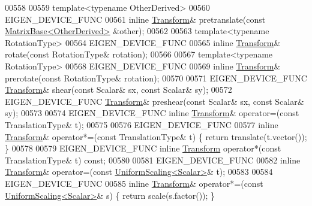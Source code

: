 \begin{DoxyCode}
00558 
00559   \textcolor{keyword}{template}<\textcolor{keyword}{typename} OtherDerived>
00560   EIGEN\_DEVICE\_FUNC
00561   \textcolor{keyword}{inline} \hyperlink{group___geometry___module_class_eigen_1_1_transform}{Transform}& pretranslate(\textcolor{keyword}{const} \hyperlink{group___core___module_class_eigen_1_1_matrix_base}{MatrixBase<OtherDerived>} &other);
00562 
00563   \textcolor{keyword}{template}<\textcolor{keyword}{typename} RotationType>
00564   EIGEN\_DEVICE\_FUNC
00565   \textcolor{keyword}{inline} \hyperlink{group___geometry___module_class_eigen_1_1_transform}{Transform}& rotate(\textcolor{keyword}{const} RotationType& rotation);
00566 
00567   \textcolor{keyword}{template}<\textcolor{keyword}{typename} RotationType>
00568   EIGEN\_DEVICE\_FUNC
00569   \textcolor{keyword}{inline} \hyperlink{group___geometry___module_class_eigen_1_1_transform}{Transform}& prerotate(\textcolor{keyword}{const} RotationType& rotation);
00570 
00571   EIGEN\_DEVICE\_FUNC \hyperlink{group___geometry___module_class_eigen_1_1_transform}{Transform}& shear(\textcolor{keyword}{const} Scalar& sx, \textcolor{keyword}{const} Scalar& sy);
00572   EIGEN\_DEVICE\_FUNC \hyperlink{group___geometry___module_class_eigen_1_1_transform}{Transform}& preshear(\textcolor{keyword}{const} Scalar& sx, \textcolor{keyword}{const} Scalar& sy);
00573 
00574   EIGEN\_DEVICE\_FUNC \textcolor{keyword}{inline} \hyperlink{group___geometry___module_class_eigen_1_1_transform}{Transform}& operator=(\textcolor{keyword}{const} TranslationType& t);
00575   
00576   EIGEN\_DEVICE\_FUNC
00577   \textcolor{keyword}{inline} \hyperlink{group___geometry___module_class_eigen_1_1_transform}{Transform}& operator*=(\textcolor{keyword}{const} TranslationType& t) \{ \textcolor{keywordflow}{return} translate(t.vector()); \}
00578   
00579   EIGEN\_DEVICE\_FUNC \textcolor{keyword}{inline} \hyperlink{group___geometry___module_class_eigen_1_1_transform}{Transform} operator*(\textcolor{keyword}{const} TranslationType& t) \textcolor{keyword}{const};
00580 
00581   EIGEN\_DEVICE\_FUNC 
00582   \textcolor{keyword}{inline} \hyperlink{group___geometry___module_class_eigen_1_1_transform}{Transform}& operator=(\textcolor{keyword}{const} \hyperlink{class_eigen_1_1_uniform_scaling}{UniformScaling<Scalar>}& t);
00583   
00584   EIGEN\_DEVICE\_FUNC
00585   \textcolor{keyword}{inline} \hyperlink{group___geometry___module_class_eigen_1_1_transform}{Transform}& operator*=(\textcolor{keyword}{const} \hyperlink{class_eigen_1_1_uniform_scaling}{UniformScaling<Scalar>}& s) \{ \textcolor{keywordflow}{return} 
      scale(s.factor()); \}

\end{DoxyCode}
